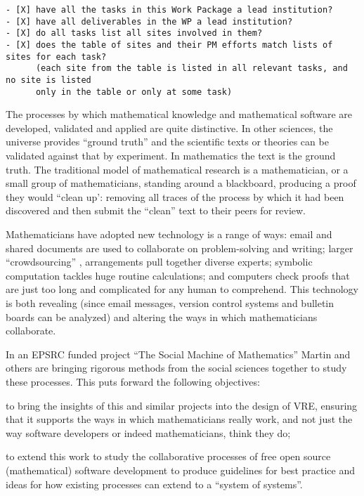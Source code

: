 \begin{draft}
\begin{verbatim}
- [X] have all the tasks in this Work Package a lead institution?
- [X] have all deliverables in the WP a lead institution?
- [X] do all tasks list all sites involved in them? 
- [X] does the table of sites and their PM efforts match lists of sites for each task?
      (each site from the table is listed in all relevant tasks, and no site is listed
      only in the table or only at some task)
\end{verbatim}
\end{draft}


\begin{workpackage}[id=social-aspects,wphases=0-48,
  title=Social Aspects,
  lead=UO,
  UORM=23,USHRM=18,USORM=6] 

\begin{wpobjectives}

The processes by which mathematical knowledge and mathematical
software are developed, validated and applied are quite
distinctive. In other sciences, the universe provides ``ground truth''
and the scientific texts or theories can be validated against that by
experiment. In mathematics the text is the ground truth. The
traditional model of mathematical research is a mathematician, or a
small group of mathematicians, standing around a blackboard, producing
a proof they would ``clean up': removing all traces of the process
by which it had been discovered and then submit the ``clean'' text to
their peers for review.

Mathematicians have adopted new technology is a range of ways: email
and shared documents are used to collaborate on problem-solving and
writing; larger ``crowdsourcing'' \cite{polymath_SIAM, PolymathBlog},
arrangements pull together diverse experts; symbolic computation
tackles huge routine calculations; and computers check proofs that are
just too long and complicated for any human to comprehend. This
technology is both revealing (since email messages, version control
systems and bulletin boards can be analyzed) and altering the ways in
which mathematicians collaborate.

In an EPSRC funded project ``The Social Machine of Mathematics''
Martin and others are bringing rigorous methods from the social 
sciences together to study these processes. This puts forward the following
objectives: 
\begin{compactitem}
\item to bring the insights of this and similar projects into the
  design of \TheProject VRE, ensuring that it supports the ways in
  which mathematicians really work, and not just the way software
  developers or indeed mathematicians, think they do;
\item to extend this work to study the collaborative processes of free
  open source (mathematical) software development to produce
  guidelines for best practice and ideas for how existing processes
  can extend to a ``system of systems''.
\end{compactitem} 
\end{wpobjectives}


\end{workpackage}
